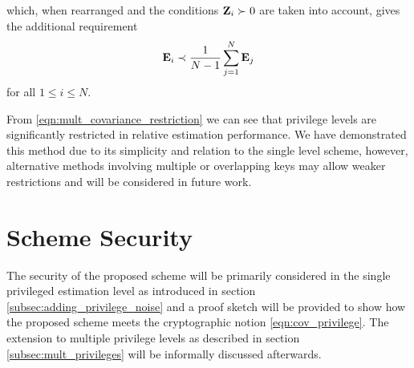 \documentclass[letterpaper, 10 pt, conference]{IEEEtran}
\theoremstyle{definition}
\begin{document}
which, when rearranged and the conditions ${{\mathbf{Z}}}_i\succ 0$ are taken into account, gives the additional requirement
\begin{equation}\label{eqn:mult_covariance_restriction}
   \mat{E}_i \prec \frac{1}{N-1}\sum_{j=1}^{N}\mat{E}_j
\end{equation}
for all $1 \leq i \leq N$.

From \eqref{eqn:mult_covariance_restriction} we can see that privilege levels are significantly restricted in relative estimation performance. We have demonstrated this method due to its simplicity and relation to the single level scheme, however, alternative methods involving multiple or overlapping keys may allow weaker restrictions and will be considered in future work.

% 
%                                                                                        
%                                                                                        
%                                                                                        
% 

\section{Scheme Security}\label{sec:scheme_security}
The security of the proposed scheme will be primarily considered in the single privileged estimation level as introduced in section \ref{subsec:adding_privilege_noise} and a proof sketch will be provided to show how the proposed scheme meets the cryptographic notion \eqref{eqn:cov_privilege}. The extension to multiple privilege levels as described in section \ref{subsec:mult_privileges} will be informally discussed afterwards.

% 
% 
\end{document}
